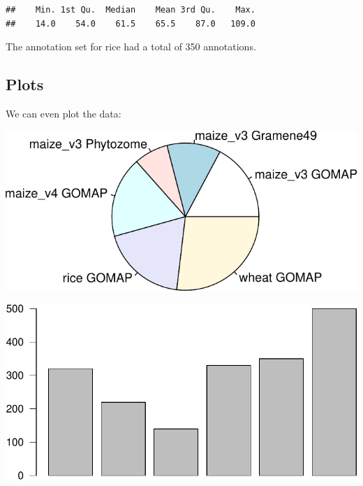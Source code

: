 \documentclass[utf8]{frontiersSCNS} %
\newenvironment{Shaded}{\begin{snugshade}}{\end{snugshade}}
\newcommand{\KeywordTok}[1]{\textcolor[rgb]{0.13,0.29,0.53}{\textbf{{#1}}}}
\newcommand{\DataTypeTok}[1]{\textcolor[rgb]{0.13,0.29,0.53}{{#1}}}
\newcommand{\DecValTok}[1]{\textcolor[rgb]{0.00,0.00,0.81}{{#1}}}
\newcommand{\StringTok}[1]{\textcolor[rgb]{0.31,0.60,0.02}{{#1}}}
\newcommand{\NormalTok}[1]{{#1}}
\begin{document}
\begin{Shaded}
\end{Shaded}

\begin{verbatim}
##    Min. 1st Qu.  Median    Mean 3rd Qu.    Max. 
##    14.0    54.0    61.5    65.5    87.0   109.0
\end{verbatim}

The annotation set for rice had a total of 350 annotations.

\subsection{Plots}\label{plots}

We can even plot the data:

\begin{Shaded}
\end{Shaded}

\includegraphics{demo-manuscript_files/figure-latex/plot-1.pdf}

\begin{Shaded}
\end{Shaded}

\includegraphics{demo-manuscript_files/figure-latex/plot2-1.pdf}
\end{document}
